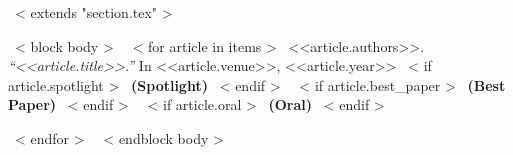 ~< extends "section.tex" >~

~< block body >~
  ~< for article in items >~
    <<article.authors>>. {\it``<<article.title>>.''} In <<article.venue>>, <<article.year>>
    ~< if article.spotlight >~
      {\bf {\color{red}(Spotlight)}}
    ~< endif >~
    ~< if article.best_paper >~
      {\bf {\color{red}(Best Paper)}}
    ~< endif >~
    ~< if article.oral >~
      {\bf {\color{red}(Oral)}}
    ~< endif >~

  ~< endfor >~
~< endblock body >~
